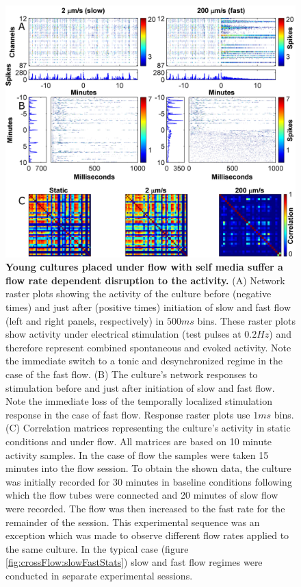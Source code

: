         \begin{figure}[!htb]
            \centering
            \includegraphics[width=14.5cm]{chapter5/figures/slowFastExample/slowFastExample.jpg}
            \caption[Example for the Effect of flow rate on the activity of a young culture under flow]{\textbf{Young cultures placed under flow with self media suffer a flow rate dependent disruption to the activity.} (A) Network raster plots showing the activity of the culture before (negative times) and just after (positive times) initiation of slow and fast flow (left and right panels, respectively) in \(500 ms\) bins. These raster plots show activity under electrical stimulation (test pulses at \(0.2Hz\)) and therefore represent combined spontaneous and evoked activity. Note the immediate switch to a tonic and desynchronized regime in the case of the fast flow. (B) The culture's network responses to stimulation before and just after initiation of slow and fast flow. Note the immediate loss of the temporally localized stimulation response in the case of fast flow. Response raster plots use \(1 ms\) bins. (C) Correlation matrices representing the culture's activity in static conditions and under flow. All matrices are based on 10 minute activity samples. In the case of flow the samples were taken 15 minutes into the flow session. To obtain the shown data, the culture was initially recorded for 30 minutes in baseline conditions following which the flow tubes were connected and 20 minutes of slow flow were recorded. The flow was then increased to the fast rate for the remainder of the session. This experimental sequence was an exception which was made to observe different flow rates applied to the same culture. In the typical case (figure \ref{fig:crossFlow:slowFastStats}) slow and fast flow regimes were conducted in separate experimental sessions.}
            \label{fig:crossFlow:slowFastExample}
        \end{figure}

